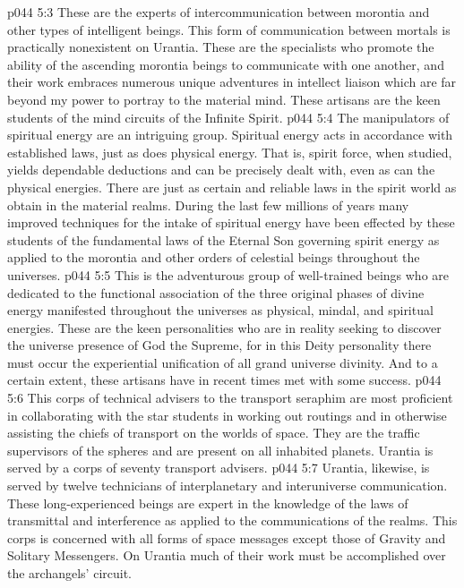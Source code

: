 \pc \vs p044 5:3 \bibnobreakspace {} These are the experts of intercommunication between morontia and other types of intelligent beings. This form of communication between mortals is practically nonexistent on Urantia. These are the specialists who promote the ability of the ascending morontia beings to communicate with one another, and their work embraces numerous unique adventures in intellect liaison which are far beyond my power to portray to the material mind. These artisans are the keen students of the mind circuits of the Infinite Spirit.
\pc \vs p044 5:4 \bibnobreakspace {} The manipulators of spiritual energy are an intriguing group. Spiritual energy acts in accordance with established laws, just as does physical energy. That is, spirit force, when studied, yields dependable deductions and can be precisely dealt with, even as can the physical energies. There are just as certain and reliable laws in the spirit world as obtain in the material realms. During the last few millions of years many improved techniques for the intake of spiritual energy have been effected by these students of the fundamental laws of the Eternal Son governing spirit energy as applied to the morontia and other orders of celestial beings throughout the universes.\plusone
\pc \vs p044 5:5 \bibnobreakspace {} This is the adventurous group of well\hyp{}trained beings who are dedicated to the functional association of the three original phases of divine energy manifested throughout the universes as physical, mindal, and spiritual energies. These are the keen personalities who are in reality seeking to discover the universe presence of God the Supreme, for in this Deity personality there must occur the experiential unification of all grand universe divinity. And to a certain extent, these artisans have in recent times met with some success.
\pc \vs p044 5:6 \bibnobreakspace {} This corps of technical advisers to the transport seraphim are most proficient in collaborating with the star students in working out routings and in otherwise assisting the chiefs of transport on the worlds of space. They are the traffic supervisors of the spheres and are present on all inhabited planets. Urantia is served by a corps of seventy transport advisers.
\pc \vs p044 5:7 \bibnobreakspace {} Urantia, likewise, is served by twelve technicians of interplanetary and interuniverse communication. These long\hyp{}experienced beings are expert in the knowledge of the laws of transmittal and interference as applied to the communications of the realms. This corps is concerned with all forms of space messages except those of Gravity and Solitary Messengers. On Urantia much of their work must be accomplished over the archangels’ circuit.
